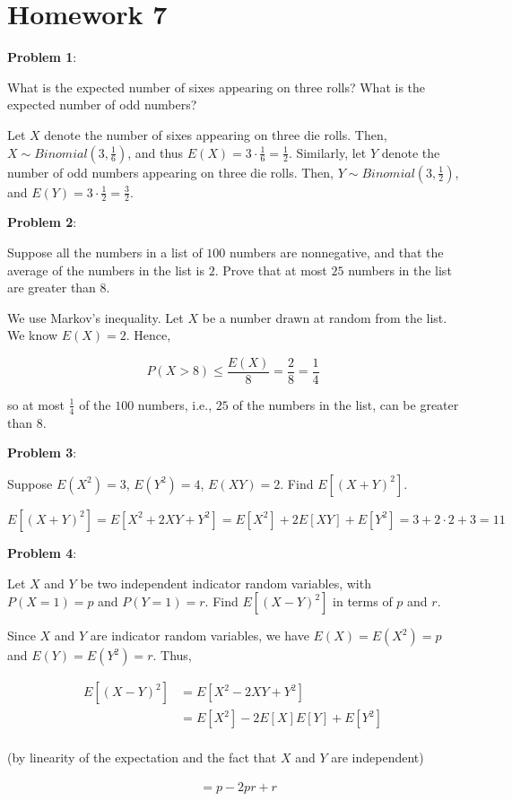 \documentclass{article}
\begin{document}
\section{Homework 7}

\noindent\textbf{Problem 1}:

What is the expected number of sixes appearing on three rolls? What is the expected number of odd numbers? 

{\color{blue}

Let $X$ denote the number of sixes appearing on three die rolls. Then, $X\sim Binomial(3,\frac{1}{6})$, and thus $E(X)=3\cdot\frac{1}{6}=\frac{1}{2}$. Similarly, let $Y$ denote the number of odd numbers appearing on three die rolls. Then, $Y\sim Binomial(3,\frac{1}{2})$, and $E(Y)=3\cdot\frac{1}{2}=\frac{3}{2}$.

}

\noindent\textbf{Problem 2}: 

Suppose all the numbers in a list of $100$ numbers are nonnegative, and that the average of the numbers in the list is $2$. Prove that at most $25$ numbers in the list are greater than $8$.

{\color{blue}

We use Markov's inequality. Let $X$ be a number drawn at random from the list. We know $E(X)=2$. Hence,

$$P(X>8)\le\frac{E(X)}{8}=\frac{2}{8}=\frac{1}{4}$$

so at most $\frac{1}{4}$ of the $100$ numbers, i.e., $25$ of the numbers in the list, can be greater than $8$.

}

\noindent\textbf{Problem 3}: 

Suppose $E(X^2)=3$, $E(Y^2)=4$, $E(XY)=2$. Find $E[(X+Y)^2]$.

{\color{blue}

$$E[(X+Y)^2]=E[X^2+2XY+Y^2]=E[X^2]+2E[XY]+E[Y^2]=3+2\cdot2+3=11$$

}

\noindent\textbf{Problem 4}:

Let $X$ and $Y$ be two independent indicator random variables, with $P(X=1)=p$ and $P(Y=1)=r$. Find $E[(X-Y)^2]$ in terms of $p$ and $r$. 

{\color{blue}

Since $X$ and $Y$ are indicator random variables, we have $E(X)=E(X^2)=p$ and $E(Y)=E(Y^2)=r$. Thus,

\begin{align*}
    E[(X-Y)^2]&=E[X^2-2XY+Y^2]\\
    &=E[X^2]-2E[X]E[Y]+E[Y^2]\\
\end{align*}

(by linearity of the expectation and the fact that $X$ and $Y$ are independent)

\begin{align*}
    &=p-2pr+r
\end{align*}

}
\end{document}
